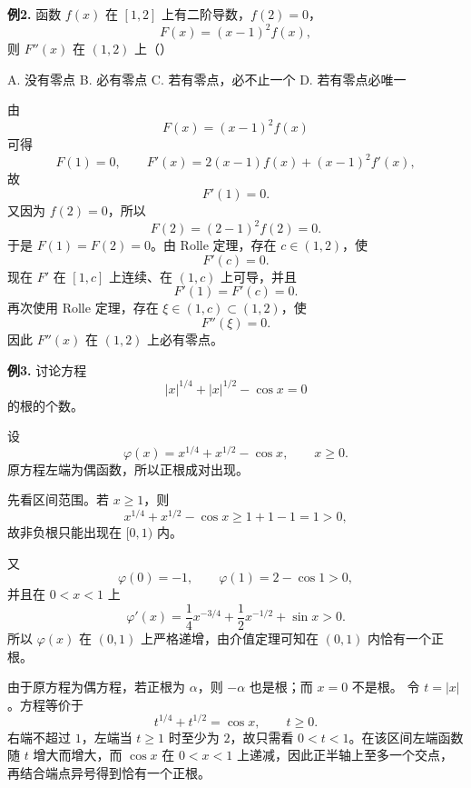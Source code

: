 \begin{problemblock}
\textbf{例2.} 函数 \(f(x)\) 在 \([1,2]\) 上有二阶导数，\(f(2)=0\)，
\[
F(x)=(x-1)^2f(x),
\]
则 \(F''(x)\) 在 \((1,2)\) 上（\quad）

A. 没有零点 \qquad B. 必有零点 \qquad
C. 若有零点，必不止一个 \qquad D. 若有零点必唯一
\end{problemblock}
\begin{solutionblock}
由
\[
F(x)=(x-1)^2f(x)
\]
可得
\[
F(1)=0,\qquad F'(x)=2(x-1)f(x)+(x-1)^2f'(x),
\]
故
\[
F'(1)=0.
\]
又因为 \(f(2)=0\)，所以
\[
F(2)=(2-1)^2f(2)=0.
\]
于是 \(F(1)=F(2)=0\)。由 Rolle 定理，存在 \(c\in(1,2)\)，使
\[
F'(c)=0.
\]
现在 \(F'\) 在 \([1,c]\) 上连续、在 \((1,c)\) 上可导，并且
\[
F'(1)=F'(c)=0.
\]
再次使用 Rolle 定理，存在 \(\xi\in(1,c)\subset(1,2)\)，使
\[
F''(\xi)=0.
\]
因此 \(F''(x)\) 在 \((1,2)\) 上必有零点。
\end{solutionblock}

\begin{problemblock}
\textbf{例3.} 讨论方程
\[
|x|^{1/4}+|x|^{1/2}-\cos x=0
\]
的根的个数。
\end{problemblock}
\begin{solutionblock}
设
\[
\varphi(x)=x^{1/4}+x^{1/2}-\cos x,\qquad x\ge0.
\]
原方程左端为偶函数，所以正根成对出现。

先看区间范围。若 \(x\ge1\)，则
\[
x^{1/4}+x^{1/2}-\cos x\ge 1+1-1=1>0,
\]
故非负根只能出现在 \([0,1)\) 内。

又
\[
\varphi(0)=-1,\qquad \varphi(1)=2-\cos1>0,
\]
并且在 \(0<x<1\) 上
\[
\varphi'(x)=\frac14x^{-3/4}+\frac12x^{-1/2}+\sin x>0.
\]
所以 \(\varphi(x)\) 在 \((0,1)\) 上严格递增，由介值定理可知在 \((0,1)\) 内恰有一个正根。

由于原方程为偶方程，若正根为 \(\alpha\)，则 \(-\alpha\) 也是根；而 \(x=0\) 不是根。
令 \(t=|x|\)。方程等价于
\[
t^{1/4}+t^{1/2}=\cos x,\qquad t\ge0.
\]
右端不超过 \(1\)，左端当 \(t\ge1\) 时至少为 \(2\)，故只需看 \(0<t<1\)。在该区间左端函数随 \(t\) 增大而增大，而 \(\cos x\) 在 \(0<x<1\) 上递减，因此正半轴上至多一个交点，再结合端点异号得到恰有一个正根。
\end{solutionblock}

